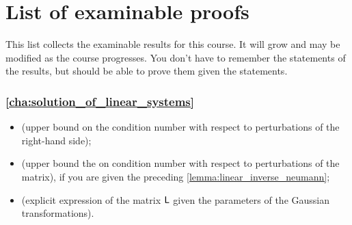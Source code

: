 \chapter*{List of examinable proofs}%
This list collects the examinable results for this course.
It will grow and may be modified as the course progresses.
You don't have to remember the statements of the results,
but should be able to prove them given the statements.

\subsection*{\cref{cha:solution_of_linear_systems}}%

\begin{itemize}
    \item {} (upper bound on the condition number with respect to perturbations of the right-hand side);
    \item {} (upper bound the on condition number with respect to perturbations of the matrix),
        if you are given the preceding \cref{lemma:linear_inverse_neumann};
    \item {} (explicit expression of the matrix $\mathsf L$ given the parameters of the Gaussian transformations).
\end{itemize}
